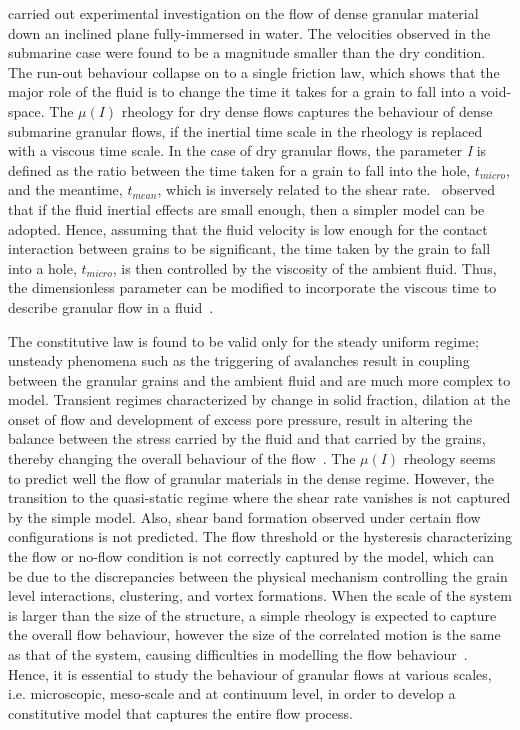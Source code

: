\citet{Cassar2005} carried out experimental 
investigation on the flow of dense granular material down an inclined plane 
fully-immersed in water. The velocities observed in the submarine case were 
found to be a magnitude smaller than the dry condition. The run-out behaviour 
collapse on to a single friction law, which shows that the major role of the 
fluid is to change the time it takes for a grain to fall into a void-space. 
The $\mu(\textit{I})$ rheology for dry dense flows captures the behaviour of 
dense submarine granular flows, if the inertial time scale in the rheology is 
replaced with a viscous time scale. In the case of dry granular flows, the 
parameter \textit{I} is defined as the ratio between the time taken for a 
grain to fall into the hole, $\textit{t}_{\textit{micro}}$, and the 
meantime, $\textit{t}_{\textit{mean}}$, which is inversely related to the shear 
rate.~\citet{Pitman2005} observed that if the fluid inertial effects are small 
enough, then a simpler model can be adopted. Hence, assuming that the fluid 
velocity is low enough for the contact interaction between grains to be 
significant, the time taken by the grain to fall into a hole, 
$\textit{t}_{\textit{micro}}$, is  then controlled by the viscosity of the 
ambient fluid. Thus, the dimensionless parameter can be modified to incorporate 
the viscous time to describe granular flow in a fluid~\citep{Pouliquen2005}. 


The constitutive law is found to be valid only for the steady uniform regime; 
unsteady phenomena such as the triggering of avalanches result in coupling 
between the granular grains and the ambient fluid and are much more complex 
to model. Transient regimes characterized by change in solid fraction, dilation 
at the onset of flow and development of excess pore pressure, result in 
altering the balance between the stress carried by the fluid and that carried 
by the grains, thereby changing the overall behaviour of the 
flow~\citep{Denlinger2001}. The $\mu (I)$ rheology seems to predict well the 
flow of granular materials in the dense regime. However, the transition to the 
quasi-static regime where the shear rate vanishes is not captured by the simple 
model. Also, shear band formation observed under certain flow configurations is 
not predicted. The flow threshold or the hysteresis characterizing the flow or 
no-flow condition is not correctly captured by the model, which can be due to 
the discrepancies between the physical mechanism controlling the grain level 
interactions, clustering, and vortex formations. When the scale of the system 
is larger than the size of the structure, a simple rheology is expected to 
capture the overall flow behaviour, however the size of the correlated motion 
is the same as that of the system, causing difficulties in modelling the flow 
behaviour~\citep{Pouliquen2005}. Hence, it is essential to study the behaviour 
of granular flows at various scales, i.e. microscopic, meso-scale and at 
continuum level, in order to develop a constitutive model that captures the 
entire flow process.

